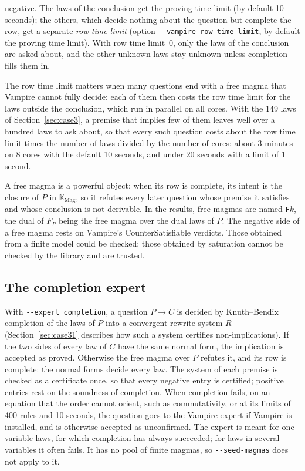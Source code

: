 \documentclass[11pt,a4paper]{article}
\theoremstyle{definition}
\theoremstyle{remark}
\newcommand{\code}[1]{\texttt{#1}}
\begin{document}
negative. The laws of the conclusion get the proving time limit (by default 10 seconds); the others, which decide nothing about the question but complete the row, get a separate \emph{row time limit} (option \code{-{}-vampire-row-time-limit}, by default the proving time limit). With row time limit~$0$, only the laws of the conclusion are asked about, and the other unknown laws stay unknown unless completion fills them in.

The row time limit matters when many questions end with a free magma that Vampire cannot fully decide: each of them then costs the row time limit for the laws outside the conclusion, which run in parallel on all cores. With the 149 laws of Section~\ref{sec:case3}, a premise that implies few of them leaves well over a hundred laws to ask about, so that every such question costs about the row time limit times the number of laws divided by the number of cores: about 3 minutes on 8 cores with the default 10 seconds, and under 20 seconds with a limit of 1 second.

A free magma is a powerful object: when its row is complete, its intent is the closure of $P$ in $\mathbb{K}_{\mathrm{Mag}}$, so it refutes every later question whose premise it satisfies and whose conclusion is not derivable. In the results, free magmas are named \code{F}$k$, the dual of $F_P$ being the free magma over the dual laws of $P$. The negative side of a free magma rests on Vampire's CounterSatisfiable verdicts. Those obtained from a finite model could be checked; those obtained by saturation cannot be checked by the library and are trusted.

\subsection{The completion expert}\label{sec:completion}

With \code{-{}-expert completion}, a question $P \to C$ is decided by Knuth--Bendix completion of the laws of $P$ into a convergent rewrite system $R$ (Section~\ref{sec:case31} describes how such a system certifies non-implications). If the two sides of every law of $C$ have the same normal form, the implication is accepted as proved. Otherwise the free magma over $P$ refutes it, and its row is complete: the normal forms decide every law. The system of each premise is checked as a certificate once, so that every negative entry is certified; positive entries rest on the soundness of completion. When completion fails, on an equation that the order cannot orient, such as commutativity, or at its limits of 400 rules and 10 seconds, the question goes to the Vampire expert if Vampire is installed, and is otherwise accepted as unconfirmed. The expert is meant for one-variable laws, for which completion has always succeeded; for laws in several variables it often fails. It has no pool of finite magmas, so \code{-{}-seed-magmas} does not apply to it.
\end{document}
